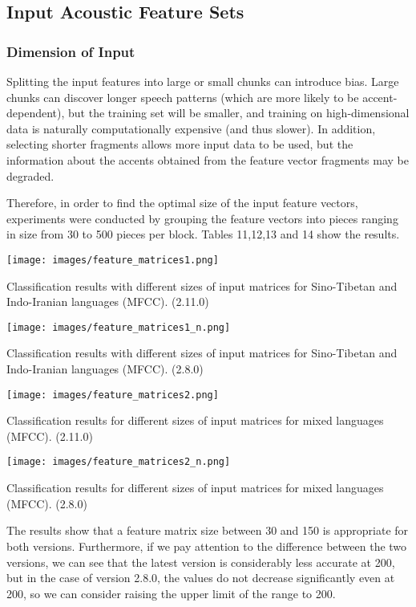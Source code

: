 \documentclass[ams]{U-AizuGT}
\begin{document}
\subsection{Input Acoustic Feature Sets}
\subsubsection{Dimension of Input}
Splitting the input features into large or small chunks can introduce bias. Large chunks can discover longer speech patterns (which are more likely to be accent-dependent), but the training set will be smaller, and training on high-dimensional data is naturally computationally expensive (and thus slower). In addition, selecting shorter fragments allows more input data to be used, but the information about the accents obtained from the feature vector fragments may be degraded.\par
Therefore, in order to find the optimal size of the input feature vectors, experiments were conducted by grouping the feature vectors into pieces ranging in size from 30 to 500 pieces per block. Tables 11,12,13 and 14 show the results.
\begin{table}[h]
    \centering
    \texttt{[image: images/feature\_matrices1.png]}
    \caption{Classification results with different sizes of input matrices for Sino-Tibetan and Indo-Iranian languages (MFCC). (2.11.0)}
\end{table}
\begin{table}[h]
    \centering
    \texttt{[image: images/feature\_matrices1\_n.png]}
    \caption{Classification results with different sizes of input matrices for Sino-Tibetan and Indo-Iranian languages (MFCC). (2.8.0)}
\end{table}

\begin{table}[h]
    \centering
    \texttt{[image: images/feature\_matrices2.png]}
    \caption{Classification results for different sizes of input matrices for mixed languages (MFCC). (2.11.0)}
\end{table}
\begin{table}[h]
    \centering
    \texttt{[image: images/feature\_matrices2\_n.png]}
    \caption{Classification results for different sizes of input matrices for mixed languages (MFCC). (2.8.0)}
\end{table}
\clearpage
The results show that a feature matrix size between 30 and 150 is appropriate for both versions. Furthermore, if we pay attention to the difference between the two versions, we can see that the latest version is considerably less accurate at 200, but in the case of version 2.8.0, the values do not decrease significantly even at 200, so we can consider raising the upper limit of the range to 200.
\end{document}
